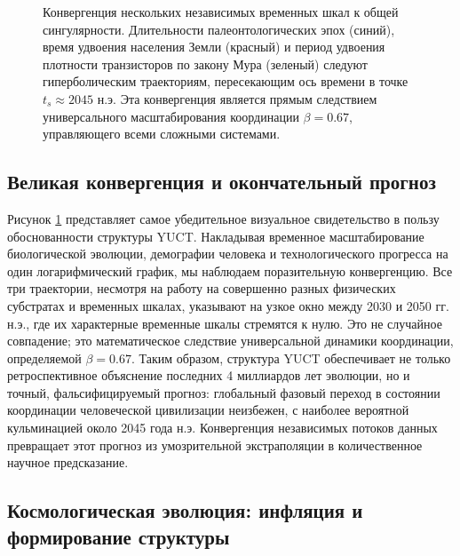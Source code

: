 \documentclass[12pt,a4paper]{article}
\theoremstyle{remark}
\begin{document}
\begin{figure}[htbp]
		\caption{Конвергенция нескольких независимых временных шкал к общей сингулярности. Длительности палеонтологических эпох (синий), время удвоения населения Земли (красный) и период удвоения плотности транзисторов по закону Мура (зеленый) следуют гиперболическим траекториям, пересекающим ось времени в точке $t_s \approx 2045$ н.э. Эта конвергенция является прямым следствием универсального масштабирования координации $\beta = 0.67$, управляющего всеми сложными системами.}
		\label{fig:great-convergence}
	\end{figure}
	
	\subsection*{Великая конвергенция и окончательный прогноз}
	
	Рисунок \ref{fig:great-convergence} представляет самое убедительное визуальное свидетельство в пользу обоснованности структуры YUCT. Накладывая временное масштабирование биологической эволюции, демографии человека и технологического прогресса на один логарифмический график, мы наблюдаем поразительную конвергенцию. Все три траектории, несмотря на работу на совершенно разных физических субстратах и временных шкалах, указывают на узкое окно между 2030 и 2050 гг. н.э., где их характерные временные шкалы стремятся к нулю. Это не случайное совпадение; это математическое следствие универсальной динамики координации, определяемой $\beta = 0.67$. Таким образом, структура YUCT обеспечивает не только ретроспективное объяснение последних 4 миллиардов лет эволюции, но и точный, фальсифицируемый прогноз: глобальный фазовый переход в состоянии координации человеческой цивилизации неизбежен, с наиболее вероятной кульминацией около 2045 года н.э. Конвергенция независимых потоков данных превращает этот прогноз из умозрительной экстраполяции в количественное научное предсказание.
	
	\subsection{Космологическая эволюция: инфляция и формирование структуры}
	\label{subsec:cosmo}
	
\end{document}
